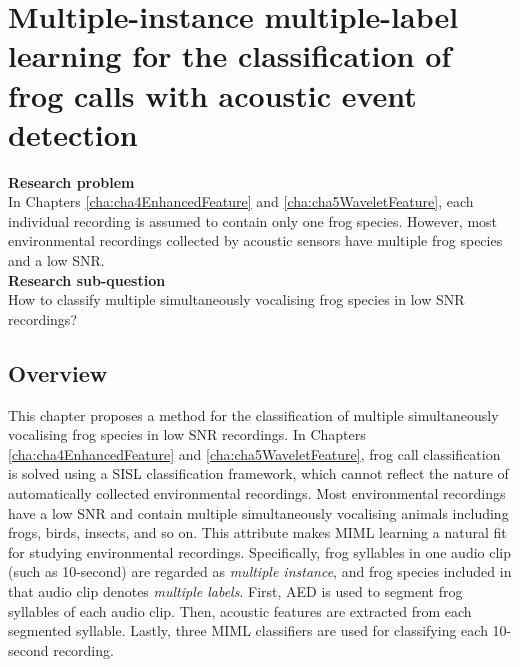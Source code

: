 \chapter{Multiple-instance multiple-label learning for the classification of frog calls with acoustic event detection}
\label{cha:cha6MIML}

\textbf{Research problem}
\\
In Chapters \ref{cha:cha4EnhancedFeature} and \ref{cha:cha5WaveletFeature}, each individual recording is assumed to contain only one frog species. However, most environmental recordings collected by acoustic sensors have multiple frog species and a low SNR.
\\
\textbf{Research sub-question}
\\
How to classify multiple simultaneously vocalising frog species in low SNR recordings?


\section{Overview}
\label{sec:intro}

This chapter proposes a method for the classification of multiple simultaneously vocalising frog species in low SNR recordings. In Chapters \ref{cha:cha4EnhancedFeature} and \ref{cha:cha5WaveletFeature}, frog call classification is solved using a SISL classification framework, which cannot reflect the nature of automatically collected environmental recordings. Most environmental recordings have a low SNR and contain multiple simultaneously vocalising animals including frogs, birds, insects, and so on. This attribute makes MIML learning a natural fit for studying environmental recordings. Specifically, frog syllables in one audio clip (such as 10-second) are regarded as \textit{multiple instance}, and frog species included in that audio clip denotes \textit{multiple labels}. 
First, AED is used to segment frog syllables of each audio clip.
Then, acoustic features are extracted from each segmented syllable. Lastly, three MIML classifiers are used for classifying each 10-second recording.



